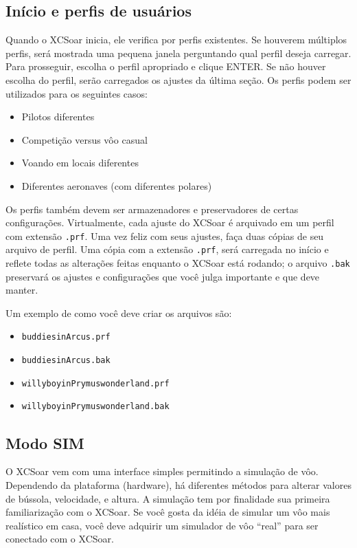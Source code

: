 \subsection*{Início e perfis de usuários}\label{sec:profiles}
Quando o XCSoar inicia, ele verifica por perfis existentes.  Se houverem múltiplos perfis, será mostrada uma pequena janela perguntando qual perfil deseja carregar.  Para prosseguir, escolha o perfil apropriado e clique ENTER.  Se não houver escolha do perfil, serão carregados os ajustes da última seção.  Os perfis podem ser utilizados para os seguintes casos:
\begin{itemize}
\item Pilotos diferentes
\item Competição versus vôo casual
\item Voando em locais diferentes
\item Diferentes aeronaves (com diferentes polares)
\end{itemize}
Os perfis também devem ser armazenadores e preservadores de certas configurações.  Virtualmente, cada ajuste do XCSoar é arquivado em um perfil com extensão \texttt{.prf}. Uma vez feliz com seus ajustes, faça duas cópias de seu arquivo de perfil.  Uma cópia com a extensão \texttt{.prf}, será carregada no início e reflete todas as alterações feitas enquanto o XCSoar está rodando; o arquivo \texttt{.bak} preservará os ajustes e configurações que você julga importante e que deve manter.

Um exemplo de como você deve criar os arquivos são:
\begin{itemize}
\item \texttt{buddiesinArcus.prf}
\item \texttt{buddiesinArcus.bak}
\item \texttt{willyboyinPrymuswonderland.prf}
\item \texttt{willyboyinPrymuswonderland.bak}
\end{itemize}

\subsection*{Modo SIM}
O XCSoar vem com uma interface simples permitindo a simulação de vôo.  Dependendo da plataforma (hardware), há diferentes métodos para alterar valores de bússola, velocidade, e altura.  A simulação tem por finalidade sua primeira familiarização com o XCSoar.  Se você gosta da idéia de simular um vôo mais realístico em casa, você deve adquirir um simulador de vôo “real” para ser conectado com o XCSoar.

